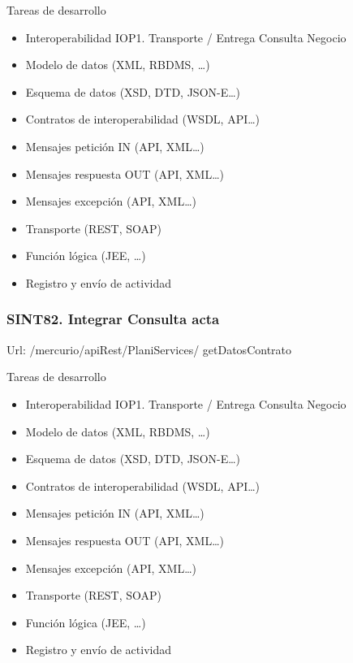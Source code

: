 \documentclass[
  paper=a4,
  ,captions=tableheading
]{scrartcl}
\providecommand{\tightlist}{%
  \setlength{\itemsep}{0pt}\setlength{\parskip}{0pt}}
\begin{document}
Tareas de desarrollo

\begin{itemize}
\tightlist
\item
  Interoperabilidad IOP1. Transporte / Entrega Consulta Negocio\\
\item
  Modelo de datos (XML, RBDMS, \ldots)
\item
  Esquema de datos (XSD, DTD, JSON-E\ldots)
\item
  Contratos de interoperabilidad (WSDL, API\ldots)
\item
  Mensajes petición IN (API, XML\ldots)
\item
  Mensajes respuesta OUT (API, XML\ldots)
\item
  Mensajes excepción (API, XML\ldots)
\item
  Transporte (REST, SOAP)
\item
  Función lógica (JEE, \ldots)
\item
  Registro y envío de actividad
\end{itemize}

\subsubsection{SINT82. Integrar Consulta
acta}\label{sec:sint82.-integrar-consulta-acta}

Url: /mercurio/apiRest/PlaniServices/ getDatosContrato

Tareas de desarrollo

\begin{itemize}
\tightlist
\item
  Interoperabilidad IOP1. Transporte / Entrega Consulta Negocio\\
\item
  Modelo de datos (XML, RBDMS, \ldots)
\item
  Esquema de datos (XSD, DTD, JSON-E\ldots)
\item
  Contratos de interoperabilidad (WSDL, API\ldots)
\item
  Mensajes petición IN (API, XML\ldots)
\item
  Mensajes respuesta OUT (API, XML\ldots)
\item
  Mensajes excepción (API, XML\ldots)
\item
  Transporte (REST, SOAP)
\item
  Función lógica (JEE, \ldots)
\item
  Registro y envío de actividad
\end{itemize}
\end{document}
